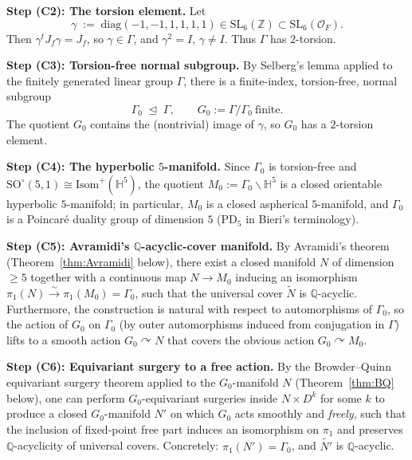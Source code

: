 \documentclass[12pt]{article}
\theoremstyle{definition}
\begin{document}
\medskip

\noindent\textbf{Step (C2): The torsion element.} Let
\[
\gamma \;:=\; \mathrm{diag}(-1,-1,1,1,1,1) \in \mathrm{SL}_6(\mathbb{Z})\subset\mathrm{SL}_6(\mathcal{O}_F).
\]
Then $\gamma^t J_f \gamma = J_f$, so $\gamma\in\Gamma$, and $\gamma^2=I$, $\gamma\neq I$. Thus $\Gamma$ has $2$-torsion.

\medskip

\noindent\textbf{Step (C3): Torsion-free normal subgroup.} By Selberg's lemma applied to the finitely generated linear group $\Gamma$, there is a finite-index, torsion-free, normal subgroup
\[
\Gamma_0 \;\trianglelefteq\; \Gamma, \qquad G_0 := \Gamma/\Gamma_0\ \text{finite}.
\]
The quotient $G_0$ contains the (nontrivial) image of $\gamma$, so $G_0$ has a $2$-torsion element.

\medskip

\noindent\textbf{Step (C4): The hyperbolic $5$-manifold.} Since $\Gamma_0$ is torsion-free and $\mathrm{SO}^\circ(5,1)\cong\mathrm{Isom}^+(\mathbb{H}^5)$, the quotient $M_0 := \Gamma_0\backslash\mathbb{H}^5$ is a closed orientable hyperbolic $5$-manifold; in particular, $M_0$ is a closed aspherical $5$-manifold, and $\Gamma_0$ is a Poincar\'e duality group of dimension $5$ (PD$_5$ in Bieri's terminology).

\medskip

\noindent\textbf{Step (C5): Avramidi's $\mathbb{Q}$-acyclic-cover manifold.} By Avramidi's theorem (Theorem~\ref{thm:Avramidi} below), there exist a closed manifold $N$ of dimension $\geq 5$ together with a continuous map $N\to M_0$ inducing an isomorphism $\pi_1(N)\xrightarrow{\sim}\pi_1(M_0)=\Gamma_0$, such that the universal cover $\widetilde{N}$ is $\mathbb{Q}$-acyclic. Furthermore, the construction is natural with respect to automorphisms of $\Gamma_0$, so the action of $G_0$ on $\Gamma_0$ (by outer automorphisms induced from conjugation in $\Gamma$) lifts to a smooth action $G_0\curvearrowright N$ that covers the obvious action $G_0\curvearrowright M_0$.

\medskip

\noindent\textbf{Step (C6): Equivariant surgery to a free action.} By the Browder--Quinn equivariant surgery theorem applied to the $G_0$-manifold $N$ (Theorem~\ref{thm:BQ} below), one can perform $G_0$-equivariant surgeries inside $N\times D^k$ for some $k$ to produce a closed $G_0$-manifold $N'$ on which $G_0$ acts smoothly and \emph{freely}, such that the inclusion of fixed-point free part induces an isomorphism on $\pi_1$ and preserves $\mathbb{Q}$-acyclicity of universal covers. Concretely: $\pi_1(N')=\Gamma_0$, and $\widetilde{N'}$ is $\mathbb{Q}$-acyclic.
\end{document}
